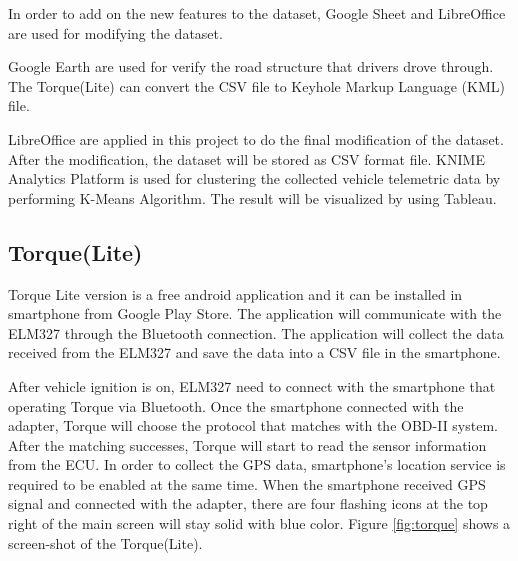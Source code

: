 In order to add on the new features to the dataset, Google Sheet and LibreOffice are used for modifying the dataset. 

Google Earth are used for verify the road structure that drivers drove through. The Torque(Lite) can convert the CSV file to Keyhole Markup Language (KML) file.
 
LibreOffice are applied in this project to do the final modification of the dataset. After the modification, the dataset will be stored as CSV format file. KNIME Analytics Platform is used for clustering the collected vehicle telemetric data by performing K-Means Algorithm. The result will be visualized by using Tableau.

\subsection{Torque(Lite)}
Torque Lite version is a free android application and it can be installed in smartphone from Google Play Store. The application will communicate with the ELM327 through the Bluetooth connection. The application will collect the data received from the ELM327 and  save the data into a CSV file in the smartphone. 

After vehicle ignition is on, ELM327 need to connect with the smartphone that operating Torque via Bluetooth. Once the smartphone connected with the adapter, Torque will choose the protocol that matches with the OBD-II system. After the matching successes, Torque will start to read the sensor information from the ECU. In order to collect the GPS data, smartphone's location service is required to be enabled at the same time. When the smartphone received GPS signal and connected with the adapter, there are four flashing icons at the top right of the main screen will stay solid with blue color. Figure \ref{fig:torque} shows a screen-shot of the Torque(Lite).

